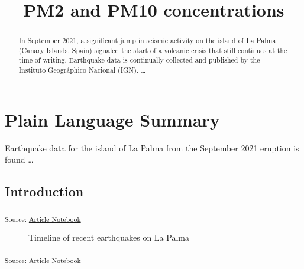 \documentclass[
]{agujournal2019}
\begin{document}
\title{PM2 and PM10 concentrations}



\begin{abstract}
In September 2021, a significant jump in seismic activity on the island
of La Palma (Canary Islands, Spain) signaled the start of a volcanic
crisis that still continues at the time of writing. Earthquake data is
continually collected and published by the Instituto Geográphico
Nacional (IGN). \ldots{}
\end{abstract}

\section*{Plain Language Summary}
Earthquake data for the island of La Palma from the September 2021
eruption is found \ldots{}



\subsection{Introduction}\label{introduction}

\textsubscript{Source:
\href{https://EmouAcademy.github.io/my-awesome-manuscripts/index.qmd.html}{Article
Notebook}}

\label{cell-fig-timeline}
\begin{figure}[H]


\caption{\label{fig-timeline}Timeline of recent earthquakes on La Palma}

\end{figure}%

\textsubscript{Source:
\href{https://EmouAcademy.github.io/my-awesome-manuscripts/index.qmd.html}{Article
Notebook}}
\end{document}
